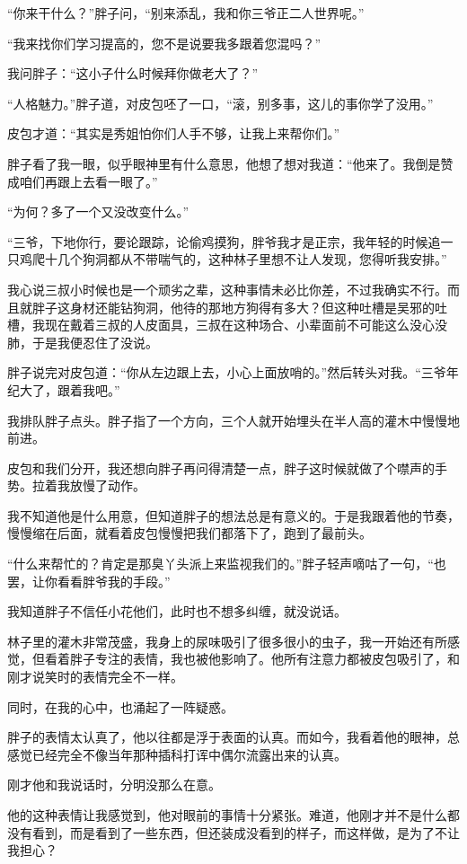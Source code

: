 “你来干什么？”胖子问，“别来添乱，我和你三爷正二人世界呢。”

“我来找你们学习提高的，您不是说要我多跟着您混吗？”

我问胖子：“这小子什么时候拜你做老大了？”

“人格魅力。”胖子道，对皮包呸了一口，“滚，别多事，这儿的事你学了没用。”

皮包才道：“其实是秀姐怕你们人手不够，让我上来帮你们。”

胖子看了我一眼，似乎眼神里有什么意思，他想了想对我道：“他来了。我倒是赞成咱们再跟上去看一眼了。”

“为何？多了一个又没改变什么。”

“三爷，下地你行，要论跟踪，论偷鸡摸狗，胖爷我才是正宗，我年轻的时候追一只鸡爬十几个狗洞都从不带喘气的，这种林子里想不让人发现，您得听我安排。”

我心说三叔小时候也是一个顽劣之辈，这种事情未必比你差，不过我确实不行。而且就胖子这身材还能钻狗洞，他待的那地方狗得有多大？但这种吐槽是吴邪的吐槽，我现在戴着三叔的人皮面具，三叔在这种场合、小辈面前不可能这么没心没肺，于是我便忍住了没说。

胖子说完对皮包道：“你从左边跟上去，小心上面放哨的。”然后转头对我。“三爷年纪大了，跟着我吧。”

我排队胖子点头。胖子指了一个方向，三个人就开始埋头在半人高的灌木中慢慢地前进。

皮包和我们分开，我还想向胖子再问得清楚一点，胖子这时候就做了个噤声的手势。拉着我放慢了动作。

我不知道他是什么用意，但知道胖子的想法总是有意义的。于是我跟着他的节奏，慢慢缩在后面，就看着皮包慢慢把我们都落下了，跑到了最前头。

“什么来帮忙的？肯定是那臭丫头派上来监视我们的。”胖子轻声嘀咕了一句，“也罢，让你看看胖爷我的手段。”

我知道胖子不信任小花他们，此时也不想多纠缠，就没说话。

林子里的灌木非常茂盛，我身上的尿味吸引了很多很小的虫子，我一开始还有所感觉，但看着胖子专注的表情，我也被他影响了。他所有注意力都被皮包吸引了，和刚才说笑时的表情完全不一样。

同时，在我的心中，也涌起了一阵疑惑。

胖子的表情太认真了，他以往都是浮于表面的认真。而如今，我看着他的眼神，总感觉已经完全不像当年那种插科打诨中偶尔流露出来的认真。

刚才他和我说话时，分明没那么在意。

他的这种表情让我感觉到，他对眼前的事情十分紧张。难道，他刚才并不是什么都没有看到，而是看到了一些东西，但还装成没看到的样子，而这样做，是为了不让我担心？


